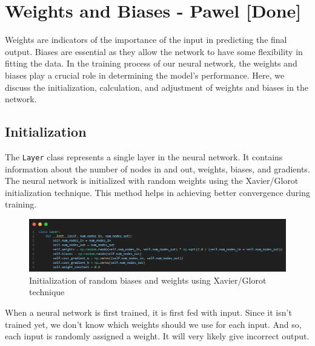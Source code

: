 \documentclass{article}
\begin{document}
\newpage
\section{Weights and Biases - Pawel  [Done]}
Weights are indicators of the importance of the input in predicting the final output. Biases are essential as they allow the network to have some flexibility in fitting the data. In the training process of our neural network, the weights and biases play a crucial role in determining the model's performance. Here, we discuss the initialization, calculation, and adjustment of weights and biases in the network. 

\subsection{Initialization}
The \texttt{Layer} class represents a single layer in the neural network. It contains information about the number of nodes in and out, weights, biases, and gradients. The neural network is initialized with random weights using the Xavier/Glorot initialization technique. This method helps in achieving better convergence during training.

\begin{figure}[ht]
    \centering 
    \includegraphics[width=1\textwidth]{images/Xavier-Glorot-initialization-for-weights.png}
    \caption{Initialization of random biases and weights using Xavier/Glorot technique}
    \label{fig:initialized_weights}
\end{figure}

When a neural network is first trained, it is first fed with input. Since it isn't trained yet, we don't know which weights should we use for each input. And so, each input is randomly assigned a weight. It will very likely give incorrect output.
\end{document}

